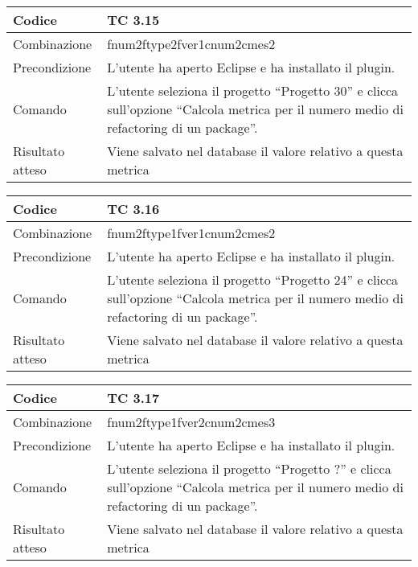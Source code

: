 \begin{table}[ht]
\begin{tabular}{|p{3cm}|p{9cm}|}
\hline
\cellcolor{lightgray}Codice				& TC 3.15								\\
\hline
\cellcolor{lightgray}Combinazione		& fnum2ftype2fver1cnum2cmes2  									\\
\hline
\cellcolor{lightgray}Precondizione		& L'utente ha aperto Eclipse e ha installato il plugin.			\\
\hline
\cellcolor{lightgray}Comando			& L'utente seleziona il progetto ``Progetto 30''  e clicca sull'opzione 
``Calcola metrica per il numero medio di refactoring di un package''.	\\
\hline
\cellcolor{lightgray}Risultato atteso	& Viene salvato nel database il valore relativo a questa metrica	\\
\hline
\end{tabular}
\end{table}

\begin{table}[ht]
\begin{tabular}{|p{3cm}|p{9cm}|}
\hline
\cellcolor{lightgray}Codice				& TC 3.16								\\
\hline
\cellcolor{lightgray}Combinazione		& fnum2ftype1fver1cnum2cmes2 									\\
\hline
\cellcolor{lightgray}Precondizione		& L'utente ha aperto Eclipse e ha installato il plugin.				\\
\hline
\cellcolor{lightgray}Comando			& L'utente seleziona il progetto ``Progetto 24''  e clicca sull'opzione ``Calcola metrica per il numero medio di refactoring di un package''.	\\
\hline
\cellcolor{lightgray}Risultato atteso	& Viene salvato nel database il valore relativo a questa metrica	\\
\hline
\end{tabular}
\end{table}

\begin{table}[ht]
\begin{tabular}{|p{3cm}|p{9cm}|}
\hline
\cellcolor{lightgray}Codice				& TC 3.17								\\
\hline
\cellcolor{lightgray}Combinazione		& fnum2ftype1fver2cnum2cmes3 								\\
\hline
\cellcolor{lightgray}Precondizione		& L'utente ha aperto Eclipse e ha installato il plugin.									\\
\hline
\cellcolor{lightgray}Comando			& L'utente seleziona il progetto ``Progetto ?''  e clicca sull'opzione ``Calcola metrica per il numero medio di refactoring di un package''.	\\
\hline
\cellcolor{lightgray}Risultato atteso	& Viene salvato nel database il valore relativo a questa metrica	\\
\hline
\end{tabular}
\end{table}


